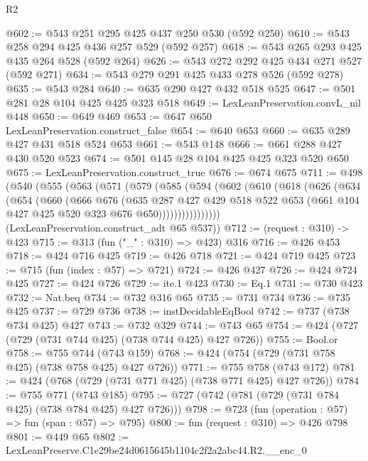 \begin{lexlean}{R2}
\begin{coremodule}
@602 := @543 @251 @295 @425 @437 @250 @530 (@592 @250)
@610 := @543 @258 @294 @425 @436 @257 @529 (@592 @257)
@618 := @543 @265 @293 @425 @435 @264 @528 (@592 @264)
@626 := @543 @272 @292 @425 @434 @271 @527 (@592 @271)
@634 := @543 @279 @291 @425 @433 @278 @526 (@592 @278)
@635 := @543 @284
@640 := @635 @290 @427 @432 @518 @525
@647 := @501 @281 @28 @104 @425 @425 @323 @518
@649 := LexLeanPreservation.convL_nil @448
@650 := @649 @469
@653 := @647 @650 LexLeanPreservation.construct_false
@654 := @640 @653
@660 := @635 @289 @427 @431 @518 @524 @653
@661 := @543 @148
@666 := @661 @288 @427 @430 @520 @523
@674 := @501 @145 @28 @104 @425 @425 @323 @520 @650
@675 := LexLeanPreservation.construct_true
@676 := @674 @675
@711 := @498
    (@540
      (@555
        (@563
          (@571
            (@579
              (@585
                (@594
                  (@602
                    (@610
                      (@618
                        (@626
                          (@634
                            (@654
                              (@660
                                (@666
                                  @676
                                  (@635
                                    @287
                                    @427
                                    @429
                                    @518
                                    @522
                                    @653
                                    (@661 @104 @427 @425 @520 @323 @676 @650))))))))))))))))
      (LexLeanPreservation.construct_adt @65 @537))
@712 := (request : @310) -> @423
@715 := @313 (fun ("_" : @310) => @423) @316
@716 := @426 @453
@718 := @424 @716 @425
@719 := @426 @718
@721 := @424 @719 @425
@723 := @715 (fun (index : @57) => @721)
@724 := @426 @427
@726 := @424 @724 @425
@727 := @424 @726
@729 := ite.{1} @423
@730 := Eq.{1}
@731 := @730 @423
@732 := Nat.beq
@734 := @732 @316 @65
@735 := @731 @734
@736 := @735 @425
@737 := @729 @736
@738 := instDecidableEqBool
@742 := @737 (@738 @734 @425) @427
@743 := @732 @329
@744 := @743 @65
@754 := @424 (@727 (@729 (@731 @744 @425) (@738 @744 @425) @427 @726))
@755 := Bool.or
@758 := @755 @744 (@743 @159)
@768 := @424 (@754 (@729 (@731 @758 @425) (@738 @758 @425) @427 @726))
@771 := @755 @758 (@743 @172)
@781 := @424 (@768 (@729 (@731 @771 @425) (@738 @771 @425) @427 @726))
@784 := @755 @771 (@743 @185)
@795 := @727 (@742 (@781 (@729 (@731 @784 @425) (@738 @784 @425) @427 @726)))
@798 := @723 (fun (operation : @57) => fun (span : @57) => @795)
@800 := fun (request : @310) => @426 @798
@801 := @449 @65
@802 := LexLeanPreserve.C1e29be24d0615645b1104c2f2a2abc44.R2.__enc_0

\end{coremodule}
\end{lexlean}
